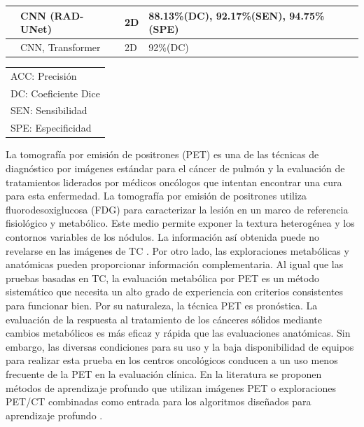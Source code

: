 \documentclass[11pt,a4paper,openany]{article}
\begin{document}
\begin{table}[H]
\begin{center}
\begin{tabular}{p{2.8cm} p{4cm} p{3.2cm} p{3.5cm}}
            \hline
            \cite{Wu2023} & CNN (RAD-UNet) & 2D & 88.13\%(DC), 92.17\%(SEN), 94.75\%(SPE) \\
            \hline
            \cite{kunkyab2024} & CNN, Transformer & 2D & 92\%(DC) \\
            \hline
            \end{tabular}
            \end{center}
            \begin{tabular}{l}
            \footnotesize ACC: Precisión \\
            \footnotesize DC: Coeficiente Dice \\
            \footnotesize SEN: Sensibilidad \\
            \footnotesize SPE: Especificidad \\
            \end{tabular}
        \end{table}




        La tomografía por emisión de positrones (PET) es una de las técnicas de diagnóstico por imágenes estándar para el cáncer de pulmón y la evaluación de tratamientos liderados por médicos oncólogos que intentan encontrar una cura para esta enfermedad. La tomografía por emisión de positrones utiliza fluorodesoxiglucosa (FDG) para caracterizar la lesión en un marco de referencia fisiológico y metabólico. Este medio permite exponer la textura heterogénea y los contornos variables de los nódulos. La información así obtenida puede no revelarse en las imágenes de TC \cite{Chen2022,Coleman1999,Coleman2006}. Por otro lado, las exploraciones metabólicas y anatómicas pueden proporcionar información complementaria. Al igual que las pruebas basadas en TC, la evaluación metabólica por PET es un método sistemático que necesita un alto grado de experiencia con criterios consistentes para funcionar bien. Por su naturaleza, la técnica PET es pronóstica. La evaluación de la respuesta al tratamiento de los cánceres sólidos mediante cambios metabólicos es más eficaz y rápida que las evaluaciones anatómicas. Sin embargo, las diversas condiciones para su uso y la baja disponibilidad de equipos para realizar esta prueba en los centros oncológicos conducen a un uso menos frecuente de la PET en la evaluación clínica. En la literatura se proponen métodos de aprendizaje profundo que utilizan imágenes PET o exploraciones PET/CT combinadas como entrada para los algoritmos diseñados para aprendizaje profundo \cite{Weyts2024}. \\
\end{document}
